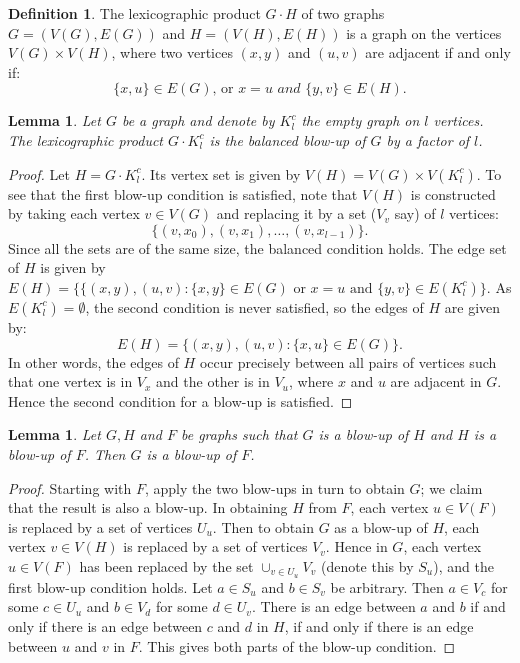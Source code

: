 \documentclass[12pt, a4paper]{article}
\newtheorem{lemma}[theorem]{Lemma}
\theoremstyle{definition}
\newtheorem{definition}[theorem]{Definition}
\begin{document}
\begin{definition}
The lexicographic product $G \cdot H$ of two graphs $G=(V(G),E(G))$ and $H=(V(H),E(H))$ is a graph on the vertices $V(G)\times V(H)$, where two vertices $(x,y)$ and $(u,v)$ are adjacent if and only if:
\[\{x,u\} \in E(G) \mbox{, or } x =u \textit{ and } \{y,v\} \in E(H).\]
\end{definition}

\begin{lemma}\label{lexi}
Let $G$ be a graph and denote by $K^c_l$ the empty graph on $l$ vertices. The lexicographic product $G \cdot K^c_l$ is the balanced blow-up of $G$ by a factor of $l$.
\end{lemma}
\begin{proof}
Let $H = G \cdot K_l^c$. Its vertex set is given by $V(H) = V(G) \times V(K_l^c)$. To see that the first blow-up condition is satisfied, note that $V(H)$ is constructed by taking each vertex $v \in V(G)$ and replacing it by a set ($V_v$ say) of $l$ vertices: 
    \[\{(v,x_0),(v,x_1),\ldots, (v,x_{l-1})\}.\]
Since all the sets are of the same size, the balanced condition holds. 
The edge set of $H$ is given by $E(H)=\{\{(x,y),(u,v) : \{x,y\} \in E(G) \text{ or } x = u \text{ and }\{y,v\} \in E(K_l^c)\}$. As $E(K_l^c) = \emptyset$, the second condition is never satisfied, so the edges of $H$ are given by:
	\[E(H)=\{(x,y),(u,v) : \{x,u\} \in E(G)\}.\]
In other words, the edges of $H$ occur precisely between all pairs of vertices such that one vertex is in $V_x$ and the other is in $V_u$, where $x$ and $u$ are adjacent in $G$.  Hence the second condition for a blow-up is satisfied.   
\end{proof}
\begin{lemma} \label{blow-upblow-up}
    Let $G,H$ and $F$ be graphs such that $G$ is a blow-up of $H$ and $H$ is a blow-up of $F$.  Then $G$ is a blow-up of $F$.
\end{lemma}
\begin{proof}
Starting with $F$, apply the two blow-ups in turn to obtain $G$; we claim that the result is also a blow-up. In obtaining $H$ from $F$, each vertex $u \in V(F)$ is replaced by a set of vertices $U_u$. Then to obtain $G$ as a blow-up of $H$, each vertex $v \in V(H)$ is replaced by a set of vertices $V_v$.  Hence in $G$, each vertex $u \in V(F)$ has been replaced by the set $\cup_{v \in U_u}V_v$ (denote this by $S_u$), and the first blow-up condition holds. Let $a \in S_u$ and $b \in S_v$ be arbitrary.  Then $a \in V_c$ for some $c \in U_u$ and $b \in V_d$ for some $d \in U_v$.  There is an edge between $a$ and $b$ if and only if there is an edge between $c$ and $d$ in $H$, if and only if there is an edge between $u$ and $v$ in $F$.  This gives both parts of the blow-up condition.
\end{proof}
\end{document}
